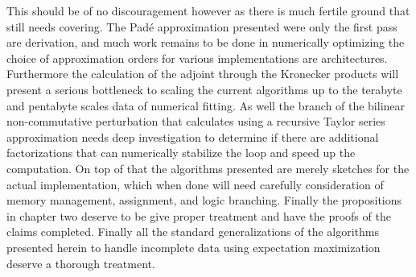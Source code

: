 This should be of no discouragement however as there is much fertile ground that still needs
covering. The Pad\'{e} approximation presented were only the first pass are derivation, and
much work remains to be done in numerically optimizing the choice of approximation orders
for various implementations are architectures. Furthermore the calculation of the adjoint
through the Kronecker products will present a serious bottleneck to scaling the current
algorithms up to the terabyte and pentabyte scales data of numerical fitting. As well the 
branch of the bilinear non-commutative perturbation that calculates using a recursive Taylor
series approximation needs deep investigation to determine if there are additional
factorizations that can numerically stabilize the loop and speed up the computation. On top
of that the algorithms presented are merely sketches for the actual implementation, which
when done will need carefully consideration of memory management, assignment, and logic
branching. Finally the propositions in chapter two deserve to be give proper treatment and
have the proofs of the claims completed. Finally all the standard generalizations of the
algorithms presented herein to handle incomplete data using expectation maximization 
deserve a thorough treatment.